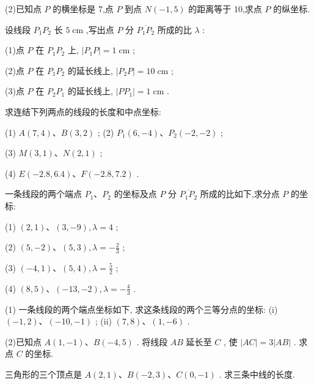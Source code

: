 \documentclass[lang=cn,newtx,10pt,scheme=chinese]{elegantbook}
\begin{document}
\begin{problemset}[习 题 一]
(2)已知点 \(P\) 的横坐标是 7,点 \(P\) 到点 \(N\left( {-1,5}\right)\) 的距离等于 10,求点 \(P\) 的纵坐标.

\item 设线段 \({P}_{1}{P}_{2}\) 长 \(5\mathrm{\;{cm}}\) ,写出点 \(P\) 分 \(\overline{{P}_{1}{P}_{2}}\) 所成的比 \(\lambda\) :

(1)点 \(P\) 在 \({P}_{1}{P}_{2}\) 上, \(\left| {{P}_{1}P}\right| = 1\mathrm{\;{cm}}\) ;

(2)点 \(P\) 在 \({P}_{1}{P}_{2}\) 的延长线上, \(\left| {{P}_{2}P}\right| = {10}\mathrm{\;{cm}}\) ;

(3)点 \(P\) 在 \({P}_{2}{P}_{1}\) 的延长线上, \(\left| {P{P}_{1}}\right| = 1\mathrm{\;{cm}}\) .

\item 求连结下列两点的线段的长度和中点坐标:

(1) \(A\left( {7,4}\right) \text{、}B\left( {3,2}\right)\) ; (2) \({P}_{1}\left( {6, - 4}\right) \text{、}{P}_{2}\left( {-2, - 2}\right)\) ;

(3) \(M\left( {3,1}\right) \text{、}N\left( {2,1}\right)\) ;

(4) \(E\left( {-{2.8},{6.4}}\right) \text{、}F\left( {-{2.8},{7.2}}\right)\) .

\item 一条线段的两个端点 \({P}_{1}\text{、}{P}_{2}\) 的坐标及点 \(P\) 分 \(\overline{{P}_{1}{P}_{2}}\) 所成的比如下,求分点 \(P\) 的坐标:

(1) \(\left( {2,1}\right) \text{、}\left( {3, - 9}\right) ,\lambda = 4\) ;

(2) \(\left( {5, - 2}\right) \text{、}\left( {5,3}\right) ,\lambda = - \frac{2}{3}\) ;

(3) \(\left( {-4,1}\right) \text{、}\left( {5,4}\right) ,\lambda = \frac{5}{2}\) ;

(4) \(\left( {8,5}\right) \text{、}\left( {-{13}, - 2}\right) ,\lambda = - \frac{4}{3}\) .

\item (1) 一条线段的两个端点坐标如下, 求这条线段的两个三等分点的坐标: (i) \(\left( {-1,2}\right) \text{、}\left( {-{10}, - 1}\right)\) ; (ii) \(\left( {7,8}\right) \text{、}\left( {1, - 6}\right)\) .

(2)已知点 \(A\left( {1, - 1}\right) \text{、}B\left( {-4,5}\right)\) . 将线段 \({AB}\) 延长至 \(C\) , 使 \(\left| {AC}\right| = 3\left| {AB}\right|\) . 求点 \(C\) 的坐标.

\item 三角形的三个顶点是 \(A\left( {2,1}\right) \text{、}B\left( {-2,3}\right) \text{、}C\left( {0, - 1}\right)\) . 求三条中线的长度.


\end{problemset}
\end{document}
